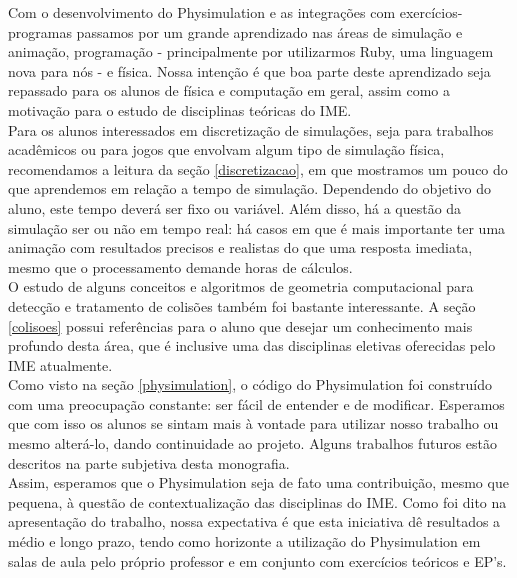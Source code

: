 
Com o desenvolvimento do Physimulation e as integrações com exercícios-programas passamos por um grande aprendizado nas áreas de simulação e animação, programação - principalmente por utilizarmos Ruby, uma linguagem nova para nós - e física. Nossa intenção é que boa parte deste aprendizado seja repassado para os alunos de física e computação em geral, assim como a motivação para o estudo de disciplinas teóricas do IME. \\

Para os alunos interessados em discretização de simulações, seja para trabalhos acadêmicos ou para jogos que envolvam algum tipo de simulação física, recomendamos a leitura da seção \ref{discretizacao}, em que mostramos um pouco do que aprendemos em relação a tempo de simulação. Dependendo do objetivo do aluno, este tempo deverá ser fixo ou variável. Além disso, há a questão da simulação ser ou não em tempo real: há casos em que é mais importante ter uma animação com resultados precisos e realistas do que uma resposta imediata, mesmo que o processamento demande horas de cálculos. \\

O estudo de alguns conceitos e algoritmos de geometria computacional para detecção e tratamento de colisões também foi bastante interessante. A seção \ref{colisoes} possui referências para o aluno que desejar um conhecimento mais profundo desta área, que é inclusive uma das disciplinas eletivas oferecidas pelo IME atualmente. \\

Como visto na seção \ref{physimulation}, o código do Physimulation foi construído com uma preocupação constante: ser fácil de entender e de modificar. Esperamos que com isso os alunos se sintam mais à vontade para utilizar nosso trabalho ou mesmo alterá-lo, dando continuidade ao projeto. Alguns trabalhos futuros estão descritos na parte subjetiva desta monografia. \\

Assim, esperamos que o Physimulation seja de fato uma contribuição, mesmo que pequena, à questão de contextualização das disciplinas do IME. Como foi dito na apresentação do trabalho, nossa expectativa é que esta iniciativa dê resultados a médio e longo prazo, tendo como horizonte a utilização do Physimulation em salas de aula pelo próprio professor e em conjunto com exercícios teóricos e EP's.
